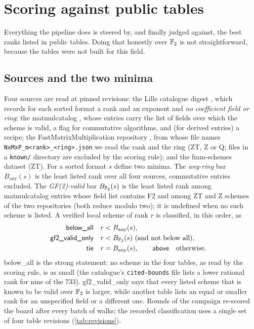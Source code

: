 \section{Scoring against public tables}\label{sec:scoring}

Everything the pipeline does is steered by, and finally judged against, the best ranks listed in public tables. Doing that honestly over ${\mathbb{F}_2}$ is not straightforward, because the tables were not built for this field.

\subsection{Sources and the two minima}
Four sources are read at pinned revisions:
the Lille catalogue digest \cite{sedoglavic2026catalogue}, which records for each sorted format a rank and an exponent and \emph{no coefficient field or ring};
the matmulcatalog \cite{lacelle2026catalog}, whose entries carry the list of fields over which the scheme is valid, a flag for commutative algorithms, and (for derived entries) a recipe;
the FastMatrixMultiplication repository \cite{perminov2026fmmrepo}, from whose file names \texttt{NxMxP\_m<rank>\_<ring>.json} we read the rank and the ring (ZT, Z or Q; files in a \texttt{known/} directory are excluded by the scoring rule);
and the fmm-schemes dataset \cite{witteveen2026schemes} (ZT).
For a sorted format $s$ define two minima.
The \emph{any-ring} bar $B_{\mathrm{any}}(s)$ is the least listed rank over all four sources, commutative entries excluded.
The \emph{GF(2)-valid} bar $B_{{\mathbb{F}_2}}(s)$ is the least listed rank among matmulcatalog entries whose field list contains F2 and among ZT and Z schemes of the two repositories (both reduce modulo two); it is undefined when no such scheme is listed.
A verified local scheme of rank $r$ is classified, in this order, as
\begin{align*}
\textsf{below\_all}&\quad r<B_{\mathrm{any}}(s),\\
\textsf{gf2\_valid\_only}&\quad r<B_{{\mathbb{F}_2}}(s)\text{ (and not below all)},\\
\textsf{tie}&\quad r=B_{\mathrm{any}}(s),\qquad\textsf{above}\quad\text{otherwise.}
\end{align*}
\textsf{below\_all} is the strong statement: no scheme in the four tables, as read by the scoring rule, is as small (the catalogue's \texttt{cited-bounds} file lists a lower rational rank for nine of the 733). \textsf{gf2\_valid\_only} says that every listed scheme that is known to be valid over ${\mathbb{F}_2}$ is larger, while another table lists an equal or smaller rank for an unspecified field or a different one.
Rounds of the campaign re-scored the board after every batch of walks; the recorded classification uses a single set of four table revisions (\cref{tab:revisions}).

